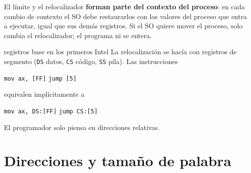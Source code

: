 \documentclass[11pt,letterpaper]{article}
\begin{document}
\begin{center}
\end{center}

\begin{idea}
El l\'imite y el relocalizador \textbf{forman parte del contexto del proceso}: en cada cambio de contexto el SO debe restaurarlos con los valores del proceso que entra a ejecutar, igual que sus dem\'as registros. Si el SO quiere mover el proceso, solo cambia el relocalizador; el programa ni se entera.
\end{idea}

\begin{ejemplo}{registros base en los primeros Intel}
La relocalizaci\'on se hac\'ia con registros de segmento (\texttt{DS} datos, \texttt{CS} c\'odigo, \texttt{SS} pila). Las instrucciones
\begin{center}\texttt{mov ax, [FF]} \qquad \texttt{jump [5]}\end{center}
equivalen impl\'icitamente a
\begin{center}\texttt{mov ax, DS:[FF]} \qquad \texttt{jump CS:[5]}\end{center}
El programador solo piensa en direcciones relativas.
\end{ejemplo}

\section{Direcciones y tama\~no de palabra}
\end{document}
